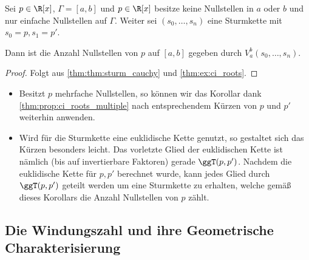 \documentclass{mythesis}
\begin{document}
\begin{corollary}[Sturm]
    Sei $p \in \R[x]$, $\Gamma = [a,b]$ und $p \in \R[x]$ besitze keine Nullstellen in $a$ oder $b$ und nur einfache Nullstellen auf $\Gamma$.
    Weiter sei $(s_0, \dotsc, s_n)$ eine Sturmkette mit $s_0 = p, s_1 = p'$.

    Dann ist die Anzahl Nullstellen von $p$ auf $[a,b]$ gegeben durch $V_a^b(s_0, \dotsc, s_n)$.
    \begin{proof}
        Folgt aus \ref{thm:thm:sturm_cauchy} und \ref{thm:ex:ci_roots}.
    \end{proof}
    \begin{note}
        \begin{itemize}
            \item
                Besitzt $p$ mehrfache Nullstellen, so können wir das Korollar dank \ref{thm:prop:ci_roots_multiple} nach entsprechendem Kürzen von $p$ und $p'$ weiterhin anwenden.
            \item
                Wird für die Sturmkette eine euklidische Kette genutzt, so gestaltet sich das Kürzen besonders leicht.
                Das vorletzte Glied der euklidischen Kette ist nämlich (bis auf invertierbare Faktoren) gerade $\ggT(p, p')$.
                Nachdem die euklidische Kette für $p, p'$ berechnet wurde, kann jedes Glied durch $\ggT(p, p')$ geteilt werden um eine Sturmkette zu erhalten, welche gemäß dieses Korollars die Anzahl Nullstellen von $p$ zählt.
        \end{itemize}
    \end{note}
\end{corollary}


\subsection{Die Windungszahl und ihre Geometrische Charakterisierung} \label{sec:wn_geom}
\end{document}
